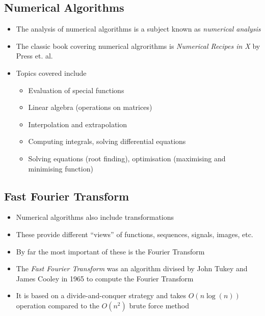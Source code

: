 \Outline %

\begin{slide}
\section[-2]{Numerical Algorithms}

\begin{PauseHighLight}
  \begin{itemize}
  \item The analysis of numerical algorithms is a subject known as
    \emph{numerical analysis}\pause
  \item The classic book covering numerical algrorithms is
    \textit{Numerical Recipes in X} by Press et. al.\pause
  \item Topics covered include
    \begin{itemize}\squeeze
    \item Evaluation of special functions\pause
    \item Linear algebra (operations on matrices)\pause
    \item Interpolation and extrapolation\pause
    \item Computing integrals, solving differential equations\pause
    \item Solving equations (root finding), optimisation (maximising and
      minimising function)\pause
    \end{itemize}
  \end{itemize}
\end{PauseHighLight}

\end{slide}



\begin{slide}
\section[-1]{Fast Fourier Transform}

\begin{PauseHighLight}
  \begin{itemize}
  \item Numerical algorithms also include transformations\pause
  \item These provide different ``views'' of functions, sequences,
    signals, images, etc.\pause
  \item By far the most important of these is the Fourier
    Transform\pause
  \item The \emph{Fast Fourier Transform} was an algorithm divised by
    John Tukey and James Cooley in 1965 to compute the Fourier
    Transform\pause
  \item It is based on a divide-and-conquer strategy and takes
    $O(n\log(n))$ operation compared to the $O(n^2)$ brute force
    method\pause
  \end{itemize}
\end{PauseHighLight}

\end{slide}

